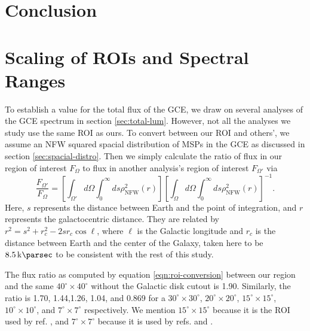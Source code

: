 \documentclass[a4paper,11pt]{article}
\newcommand{\brackets}[1]{\left[#1\right]}
\newcommand{\comment}[1]{\emph{\color{red}{#1}}}
\begin{document}
\section{Conclusion}
\comment{I thought I'd leave writing the introduction and conclusion until the rest of the paper is done, in case things change.}

\comment{Effect of our research on the predictions by Fermilab}

\comment{Number of pulsars in the GCE}

\comment{Comparison between the GCE- and GCL-derived luminosity functions and which matches observations more accurately}

\comment{The observed flux distribution matches the predicted distribution of MSPs, but is not sensitive to the luminosity function}

\comment{Future sensitivity}


\appendix
\section{Scaling of ROIs and Spectral Ranges}
\label{app:roi-rescale}
To establish a value for the total flux of the GCE, we draw on several analyses of the GCE spectrum in section \ref{sec:total-lum}. However, not all the analyses we study use the same ROI as ours. To convert between our ROI and others', we assume an NFW squared spacial distribution of MSPs in the GCE as discussed in section \ref{sec:spacial-distro}. Then we simply calculate the ratio of flux in our region of interest $F_\Omega$ to flux in another analysis's region of interest $F_{\Omega'}$ via
\begin{equation}
    \frac{F_{\Omega'}}{F_\Omega} = \brackets{\int_{\Omega'}d\Omega\int_0^\infty ds \rho_\text{NFW}^2 (r)}\brackets{\int_{\Omega}d\Omega\int_0^\infty ds \rho_\text{NFW}^2 (r)}^{-1}.
    \label{eqn:roi-conversion}
\end{equation}
Here, $s$ represents the distance between Earth and the point of integration, and $r$ represents the galactocentric distance. They are related by $r^2 = s^2 + r_c^2 - 2 s r_c \cos\ell$, where $\ell$ is the Galactic longitude and $r_c$ is the distance between Earth and the center of the Galaxy, taken here to be $\SI{8.5}{\kilo\parsec}$ to be consistent with the rest of this study.

The flux ratio as computed by equation \ref{eqn:roi-conversion} between our region and the same $40^\circ \times 40^\circ$ without the Galactic disk cutout is 1.90. Similarly, the ratio is 1.70, 1.44,1.26, 1.04, and 0.869 for a $30^\circ \times 30^\circ $, $20^\circ \times 20^\circ$, $15^\circ \times 15^\circ$, $10^\circ \times 10^\circ$, and $7^\circ \times 7^\circ$ respectively. We mention $15^\circ \times 15^\circ$ because it is the ROI used by ref. \cite{Ajello:2015kwa}, and $7^\circ \times 7^\circ$ because it is used by refs. \cite{Abazajian:2014fta} and \cite{Gordon13}.
\end{document}
